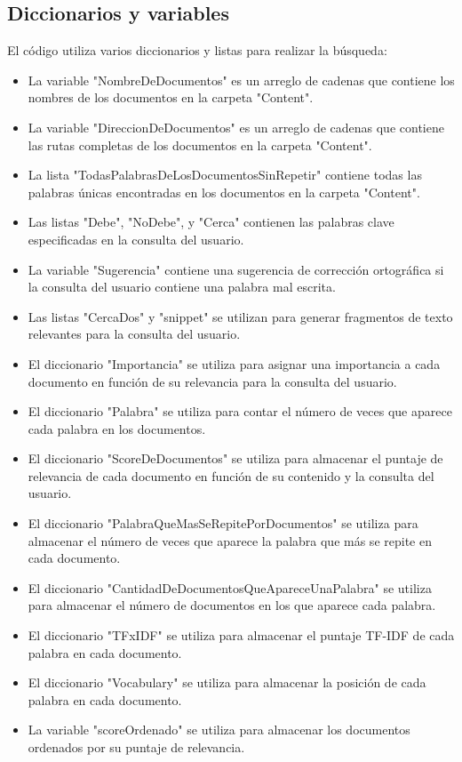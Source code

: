 \documentclass{article}
\begin{document}
\subsection{Diccionarios y variables }
El código utiliza varios diccionarios y listas para realizar la búsqueda:
\begin{itemize}
    \item La variable "NombreDeDocumentos" es un arreglo de cadenas que contiene 
    los nombres de los documentos en la carpeta "Content".
    \item La variable "DireccionDeDocumentos" es un arreglo de cadenas que contiene 
las rutas completas de los documentos en la carpeta "Content". 
    \item La lista "TodasPalabrasDeLosDocumentosSinRepetir" contiene todas las 
palabras únicas encontradas en los documentos en la carpeta "Content". 
    \item Las listas "Debe", "NoDebe", y "Cerca" contienen las palabras clave 
especificadas en la consulta del usuario. 
    \item La variable "Sugerencia" contiene una sugerencia de corrección ortográfica si 
la consulta del usuario contiene una palabra mal escrita. 
    \item Las listas "CercaDos" y "snippet" se utilizan para generar fragmentos de texto 
relevantes para la consulta del usuario. 
    \item El diccionario "Importancia" se utiliza para asignar una importancia a cada 
documento en función de su relevancia para la consulta del usuario. 
    \item El diccionario "Palabra" se utiliza para contar el número de veces que aparece 
cada palabra en los documentos. 
    \item El diccionario "ScoreDeDocumentos" se utiliza para almacenar el puntaje de 
relevancia de cada documento en función de su contenido y la consulta del 
usuario. 
    \item El diccionario "PalabraQueMasSeRepitePorDocumentos" se utiliza para 
almacenar el número de veces que aparece la palabra que más se repite en 
cada documento. 
    \item El diccionario "CantidadDeDocumentosQueApareceUnaPalabra" se utiliza 
para almacenar el número de documentos en los que aparece cada palabra. 
    \item El diccionario "TFxIDF" se utiliza para almacenar el puntaje TF-IDF de cada 
palabra en cada documento. 
    \item El diccionario "Vocabulary" se utiliza para almacenar la posición de cada 
palabra en cada documento. 
    \item La variable "scoreOrdenado" se utiliza para almacenar los documentos 
ordenados por su puntaje de relevancia. 


\end{itemize} 
 
\end{document}
